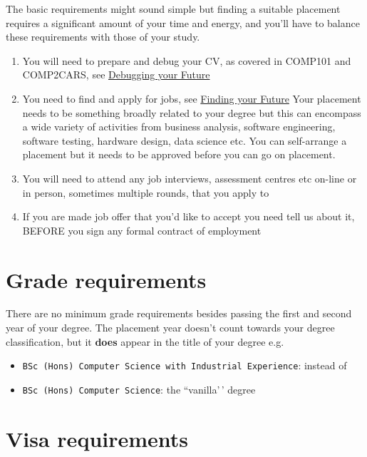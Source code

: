 \documentclass[
]{book}
\providecommand{\tightlist}{%
  \setlength{\itemsep}{0pt}\setlength{\parskip}{0pt}}
\begin{document}
The basic requirements might sound simple but finding a suitable placement requires a significant amount of your time and energy, and you'll have to balance these requirements with those of your study.

\begin{enumerate}
\def\labelenumi{\arabic{enumi}.}
\tightlist
\item
  You will need to prepare and debug your CV, as covered in COMP101 and COMP2CARS, see \href{https://www.cdyf.me/debugging}{Debugging your Future} \citep{debugging}
\item
  You need to find and apply for jobs, see \href{https://www.cdyf.me/finding}{Finding your Future} \citep{finding} Your placement needs to be something broadly related to your degree but this can encompass a wide variety of activities from business analysis, software engineering, software testing, hardware design, data science etc. You can self-arrange a placement but it needs to be approved before you can go on placement.
\item
  You will need to attend any job interviews, assessment centres etc on-line or in person, sometimes multiple rounds, that you apply to
\item
  If you are made job offer that you'd like to accept you need tell us about it, BEFORE you sign any formal contract of employment
\end{enumerate}

\section{Grade requirements}\label{grade-requirements}

There are no minimum grade requirements besides passing the first and second year of your degree. The placement year doesn't count towards your degree classification, but it \textbf{does} appear in the title of your degree e.g.

\begin{itemize}
\tightlist
\item
  \texttt{BSc\ (Hons)\ Computer\ Science\ with\ Industrial\ Experience}: instead of
\item
  \texttt{BSc\ (Hons)\ Computer\ Science}: the ``vanilla'\,' degree
\end{itemize}

\section{Visa requirements}\label{visa-requirements}
\end{document}
